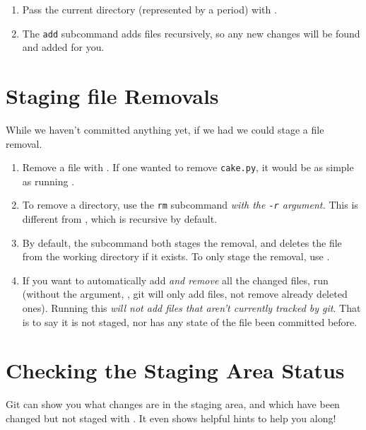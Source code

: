 \documentclass[11pt,letterpaper,twoside]{report}
\begin{document}
\noindent
{}
\begin{enumerate}
\item Pass the current directory (represented by a period) with
    .
\item The \texttt{add} subcommand adds files recursively, so any new changes
    will be found and added for you.
\end{enumerate}


\section{Staging file Removals}

While we haven't committed anything yet, if we had we could stage a file
removal.

\begin{enumerate}
\item Remove a file with . If one wanted to remove
    \texttt{cake.py}, it would be as simple as running .
\item To remove a directory, use the \texttt{rm} subcommand \emph{with the
    \texttt{-r} argument.} This is different from , which is
    recursive by default.
\item By default, the subcommand both stages the removal, and deletes the file
    from the working directory if it exists. To only stage the removal, use
    .
\item If you want to automatically add \emph{and remove} all the changed files,
    run  (without the  argument,
    , git will only add files, not remove already deleted ones).
    Running this \emph{will not add files that aren't currently tracked by git}.
    That is to say it is not staged, nor has any state of the file been
    committed before.
\end{enumerate}

\section{Checking the Staging Area Status}

Git can show you what changes are in the staging area, and which have been
changed but not staged with . It even shows helpful hints to
help you along!
\end{document}
